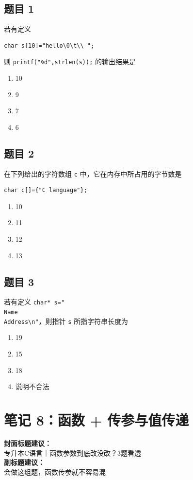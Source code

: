 \documentclass[12pt,a4paper]{ctexart}
\begin{document}
\subsection*{题目 1}
若有定义
\begin{lstlisting}
char s[10]="hello\0\t\\ ";
\end{lstlisting}
则 \texttt{printf("\%d",strlen(s));} 的输出结果是
\begin{enumerate}[label=\Alph*.]
    \item 10
    \item 9
    \item 7
    \item 6
\end{enumerate}

\subsection*{题目 2}
在下列给出的字符数组 \texttt{c} 中，它在内存中所占用的字节数是
\begin{lstlisting}
char c[]={"C language"};
\end{lstlisting}

\begin{enumerate}[label=\Alph*.]
    \item 10
    \item 11
    \item 12
    \item 13
\end{enumerate}

\subsection*{题目 3}
若有定义 \texttt{char* s="\\Name\\Address\textbackslash n"}，则指针 \texttt{s} 所指字符串长度为
\begin{enumerate}[label=\Alph*.]
    \item 19
    \item 15
    \item 18
    \item 说明不合法
\end{enumerate}

\newpage

\section{笔记 8：函数 + 传参与值传递}
\begin{coverbox}
\textbf{封面标题建议：}\\
专升本C语言｜函数参数到底改没改？3题看透\\
\textbf{副标题建议：}\\
会做这组题，函数传参就不容易混
\end{coverbox}
\end{document}
